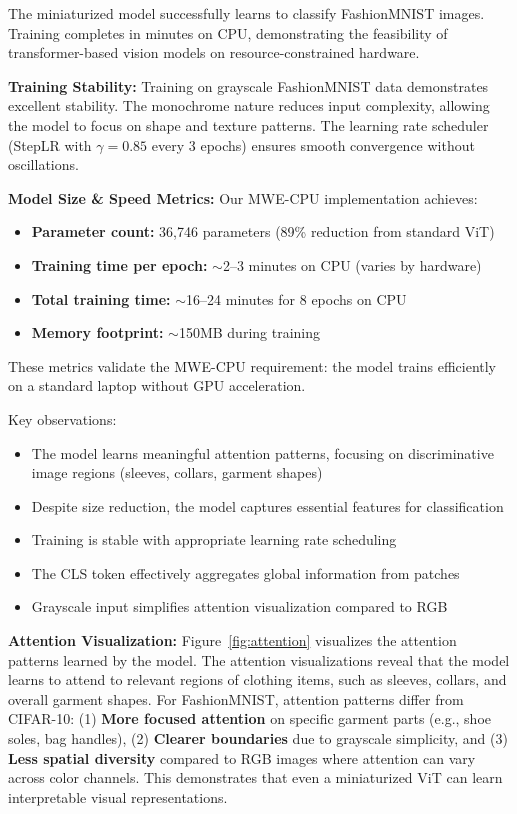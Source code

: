\documentclass{article}
\begin{document}
The miniaturized model successfully learns to classify FashionMNIST images. Training completes in minutes on CPU, demonstrating the feasibility of transformer-based vision models on resource-constrained hardware.

\textbf{Training Stability:} Training on grayscale FashionMNIST data demonstrates excellent stability. The monochrome nature reduces input complexity, allowing the model to focus on shape and texture patterns. The learning rate scheduler (StepLR with $\gamma=0.85$ every 3 epochs) ensures smooth convergence without oscillations.

\textbf{Model Size \& Speed Metrics:} Our MWE-CPU implementation achieves:
\begin{itemize}
    \item \textbf{Parameter count:} 36,746 parameters (89\% reduction from standard ViT)
    \item \textbf{Training time per epoch:} $\sim$2--3 minutes on CPU (varies by hardware)
    \item \textbf{Total training time:} $\sim$16--24 minutes for 8 epochs on CPU
    \item \textbf{Memory footprint:} $\sim$150MB during training
\end{itemize}

These metrics validate the MWE-CPU requirement: the model trains efficiently on a standard laptop without GPU acceleration.

Key observations:
\begin{itemize}
    \item The model learns meaningful attention patterns, focusing on discriminative image regions (sleeves, collars, garment shapes)
    \item Despite size reduction, the model captures essential features for classification
    \item Training is stable with appropriate learning rate scheduling
    \item The CLS token effectively aggregates global information from patches
    \item Grayscale input simplifies attention visualization compared to RGB
\end{itemize}

\textbf{Attention Visualization:} Figure~\ref{fig:attention} visualizes the attention patterns learned by the model. The attention visualizations reveal that the model learns to attend to relevant regions of clothing items, such as sleeves, collars, and overall garment shapes. For FashionMNIST, attention patterns differ from CIFAR-10: (1) \textbf{More focused attention} on specific garment parts (e.g., shoe soles, bag handles), (2) \textbf{Clearer boundaries} due to grayscale simplicity, and (3) \textbf{Less spatial diversity} compared to RGB images where attention can vary across color channels. This demonstrates that even a miniaturized ViT can learn interpretable visual representations.
\end{document}
